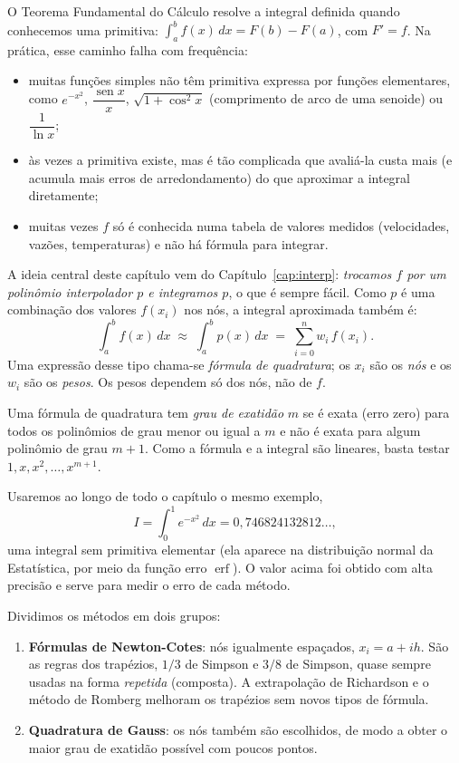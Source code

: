 O Teorema Fundamental do Cálculo resolve a integral definida quando conhecemos uma
primitiva: $\int_a^b f(x)\,dx=F(b)-F(a)$, com $F'=f$. Na prática, esse caminho falha com
frequência:
\begin{itemize}[nosep]
  \item muitas funções simples não têm primitiva expressa por funções elementares, como
        $e^{-x^2}$, $\dfrac{\operatorname{sen}x}{x}$, $\sqrt{1+\cos^2x}$ (comprimento de arco de
        uma senoide) ou $\dfrac{1}{\ln x}$;
  \item às vezes a primitiva existe, mas é tão complicada que avaliá-la custa mais (e
        acumula mais erros de arredondamento) do que aproximar a integral diretamente;
  \item muitas vezes $f$ só é conhecida numa tabela de valores medidos (velocidades,
        vazões, temperaturas) e não há fórmula para integrar.
\end{itemize}

A ideia central deste capítulo vem do Capítulo~\ref{cap:interp}: \emph{trocamos $f$ por um
polinômio interpolador $p$ e integramos $p$}, o que é sempre fácil. Como $p$ é uma
combinação dos valores $f(x_i)$ nos nós, a integral aproximada também é:
\[
\int_a^b f(x)\,dx\;\approx\;\int_a^b p(x)\,dx\;=\;\sum_{i=0}^{n}w_i\,f(x_i).
\]
Uma expressão desse tipo chama-se \emph{fórmula de quadratura}; os $x_i$ são os \emph{nós}
e os $w_i$ são os \emph{pesos}. Os pesos dependem só dos nós, não de $f$.

\begin{definicao}
Uma fórmula de quadratura tem \emph{grau de exatidão} $m$ se é exata (erro zero) para
todos os polinômios de grau menor ou igual a $m$ e não é exata para algum polinômio de
grau $m+1$. Como a fórmula e a integral são lineares, basta testar
$1,x,x^2,\dots,x^{m+1}$.
\end{definicao}

Usaremos ao longo de todo o capítulo o mesmo exemplo,
\[
I=\int_0^1 e^{-x^2}\,dx = 0{,}746824132812\dots,
\]
uma integral sem primitiva elementar (ela aparece na distribuição normal da Estatística,
por meio da função erro $\operatorname{erf}$). O valor acima foi obtido com alta precisão e
serve para medir o erro de cada método.

Dividimos os métodos em dois grupos:
\begin{enumerate}[nosep]
  \item \textbf{Fórmulas de Newton-Cotes}: nós igualmente espaçados, $x_i=a+ih$. São as regras
        dos trapézios, $1/3$ de Simpson e $3/8$ de Simpson, quase sempre usadas na forma
        \emph{repetida} (composta). A extrapolação de Richardson e o método de Romberg
        melhoram os trapézios sem novos tipos de fórmula.
  \item \textbf{Quadratura de Gauss}: os nós também são escolhidos, de modo a obter o maior
        grau de exatidão possível com poucos pontos.
\end{enumerate}

